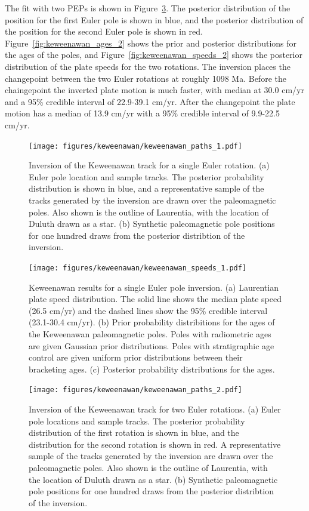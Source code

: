 \documentclass[preprint,12pt,authoryear]{elsarticle}
\begin{document}
The fit with two PEPs is shown in Figure~\ref{fig:keweenawan_paths_2}.
The posterior distribution of the position for the first Euler pole is shown in blue,
and the posterior distribution of the position for the second Euler pole is shown in red.
Figure~\ref{fig:keweenawan_ages_2} shows the prior and posterior distributions for the ages of the poles,
and Figure~\ref{fig:keweenawan_speeds_2} shows the posterior distribution of the plate speeds for the two rotations.
The inversion places the changepoint between the two Euler rotations at roughly 1098 Ma.
Before the chaingepoint the inverted plate motion is much faster, with median at 30.0 cm/yr
and a 95\% credible interval of 22.9-39.1 cm/yr. After the changepoint the plate motion has a median
of 13.9 cm/yr with a 95\% credible interval of 9.9-22.5 cm/yr.


\begin{figure}
\texttt{[image: figures/keweenawan/keweenawan\_paths\_1.pdf]}
\caption[Inversion of the Keweenawan track for a single Euler rotation]{Inversion of the Keweenawan track for a single Euler rotation. 
(a) Euler pole location and sample tracks. The posterior probability distribution is shown in blue, and a representative sample of the tracks generated by the inversion are drawn over the paleomagnetic poles. Also shown is the outline of Laurentia, with the location of Duluth drawn as a star.
(b) Synthetic paleomagnetic pole positions for one hundred draws from the posterior distribtion of the inversion.}
\label{fig:keweenawan_paths_1}
\end{figure}

\begin{figure}
\texttt{[image: figures/keweenawan/keweenawan\_speeds\_1.pdf]}
\caption[Keweenawan results for a single Euler pole inversion]{ Keweenawan results for a single Euler pole inversion.
(a) Laurentian plate speed distribution. The solid line shows the median plate speed (26.5 cm/yr) and the dashed lines show the 95\% credible interval (23.1-30.4 cm/yr).
(b) Prior probability distribitions for the ages of the Keweenawan paleomagnetic poles. Poles with radiometric ages are given Gaussian prior distributions. Poles with stratigraphic age control are given uniform prior distributions between their bracketing ages. 
(c) Posterior probability distributions for the ages.}
\label{fig:keweenawan_speeds_1}
\end{figure}

\begin{figure}
\texttt{[image: figures/keweenawan/keweenawan\_paths\_2.pdf]}
\caption[Inversion of the Keweenawan track for two Euler rotations]{Inversion of the Keweenawan track for two Euler rotations.
(a) Euler pole locations and sample tracks. The posterior probability distribution of the first rotation is shown in blue, and the distribution for the second rotation is shown in red.
A representative sample of the tracks generated by the inversion are drawn over the paleomagnetic poles. 
Also shown is the outline of Laurentia, with the location of Duluth drawn as a star.
(b) Synthetic paleomagnetic pole positions for one hundred draws from the posterior distribtion of the inversion.}
\label{fig:keweenawan_paths_2}
\end{figure}
\end{document}
